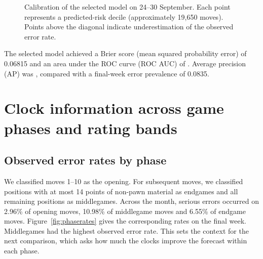 \documentclass[10pt,a4paper]{article}
\begin{document}
\begin{figure}[H]\centering
{}
\caption{Calibration of the selected model on 24--30 September. Each point represents a predicted-risk decile (approximately 19,650 moves). Points above the diagonal indicate underestimation of the observed error rate.}\label{fig:calibration}
\end{figure}
The selected model achieved a Brier score (mean squared probability error) of 0.06815 and an area under the ROC curve (ROC AUC) of \BestAUC{}. Average precision (AP) was \BestAP{}, compared with a final-week error prevalence of 0.0835.

\section{Clock information across game phases and rating bands}
\subsection{Observed error rates by phase}
We classified moves 1--10 as the opening. For subsequent moves, we classified positions with at most 14 points of non-pawn material as endgames and all remaining positions as middlegames. Across the month, serious errors occurred on 2.96\% of opening moves, 10.98\% of middlegame moves and 6.55\% of endgame moves. Figure~\ref{fig:phaserates} gives the corresponding rates on the final week. Middlegames had the highest observed error rate. This sets the context for the next comparison, which asks how much the clocks improve the forecast within each phase.
\end{document}
